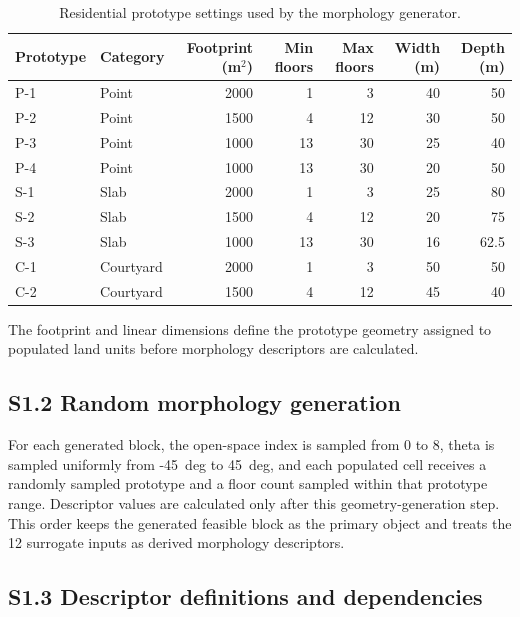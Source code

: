 \documentclass[11pt]{article}
\begin{document}
\begin{table}[H]
\caption{Residential prototype settings used by the morphology generator.}
\label{tab:s-prototypes}
\centering
\small
\setlength{\tabcolsep}{6pt}
\renewcommand{\arraystretch}{1.08}
\begin{threeparttable}
\begin{tabular*}{\linewidth}{@{\extracolsep{\fill}}llrrrrr@{}}
\toprule
Prototype & Category & Footprint (m$^2$) & Min floors & Max floors & Width (m) & Depth (m) \\
\midrule
P-1 & Point & 2000 & 1 & 3 & 40 & 50 \\
P-2 & Point & 1500 & 4 & 12 & 30 & 50 \\
P-3 & Point & 1000 & 13 & 30 & 25 & 40 \\
P-4 & Point & 1000 & 13 & 30 & 20 & 50 \\
S-1 & Slab & 2000 & 1 & 3 & 25 & 80 \\
S-2 & Slab & 1500 & 4 & 12 & 20 & 75 \\
S-3 & Slab & 1000 & 13 & 30 & 16 & 62.5 \\
C-1 & Courtyard & 2000 & 1 & 3 & 50 & 50 \\
C-2 & Courtyard & 1500 & 4 & 12 & 45 & 40 \\
\bottomrule
\end{tabular*}
\begin{tablenotes}[flushleft]
\footnotesize
\item The footprint and linear dimensions define the prototype geometry assigned to populated land units before morphology descriptors are calculated.
\end{tablenotes}
\end{threeparttable}
\end{table}

\subsection*{S1.2 Random morphology generation}

For each generated block, the open-space index is sampled from 0 to 8, theta is sampled uniformly from -45~deg to 45~deg, and each populated cell receives a randomly sampled prototype and a floor count sampled within that prototype range. Descriptor values are calculated only after this geometry-generation step. This order keeps the generated feasible block as the primary object and treats the 12 surrogate inputs as derived morphology descriptors.

\subsection*{S1.3 Descriptor definitions and dependencies}
\end{document}
